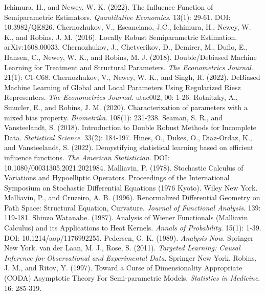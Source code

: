 \documentclass[uplatex, dvipdfmx]{jsarticle}
\begin{document}
\begin{thebibliography}{99}
    Ichimura, H., and Newey, W. K. (2022). The Influence Function of Semiparametric Estimators. \textit{Quantitative Economics}. 13(1): 29-61. DOI: 10.3982/QE826.
    Chernozhukov, V., Escanciano, J.C., Ichimura, H., Newey, W. K., and Robins, J. M. (2016). Locally Robust Semiparametric Estimation. arXiv:1608.00033.
    Chernozhukov, J., Chetverikov, D., Demirer, M., Duflo, E., Hansen, C., Newey, W. K., and Robins, M. J. (2018). Double/Debiased Machine Learning for Treatment and Structural Parameters. \textit{The Econometrics Journal}. 21(1): C1-C68.
    Chernozhukov, V., Newey, W. K., and Singh, R. (2022). DeBiased Machine Learning of Global and Local Parameters Using Regularized Riesz Representers. \textit{The Econometrics Journal}. utac002, 00: 1-26.
    Rotnitzky, A., Smucler, E., and Robins, J. M. (2020). Characterization of parameters with a mixed bias property. \textit{Biometrika}. 108(1): 231-238.
    Seaman, S. R., and Vansteelandt, S. (2018). Introduction to Double Robust Methods for Incomplete Data. \textit{Statistical Science}. 33(2): 184-197.
    Hines, O., Dukes, O., Diaz-Ordaz, K., and Vansteelandt, S. (2022). Demystifying statistical learning based on efficient influence functions. \textit{The American Statistician}. DOI: 10.1080/00031305.2021.2021984.
    Malliavin, P. (1978). Stochastic Calculus of Variations and Hypoelliptic Operators. Proceedings of the International Symposium on Stochastic Differential Equations (1976 Kyoto). Wiley New York.
    Malliavin, P., and Cruzeiro, A. B. (1996). Renormalized Differential Geometry on Path Space: Structural Equation, Curvature. \textit{Journal of Functional Analysis}. 139: 119-181.
    Shinzo Watanabe. (1987). Analysis of Wiener Functionals (Malliavin Calculus) and its Applications to Heat Kernels. \textit{Annals of Probability}. 15(1): 1-39. DOI: 10.1214/aop/1176992255.
    Pedersen, G. K. (1989). \textit{Analysis Now}. Springer New York.
    van der Laan, M. J., Rose, S. (2011). \textit{Targeted Learning: Causal Inference for Observational and Experimental Data}. Springer New York.
    Robins, J. M., and Ritov, Y. (1997). Toward a Curse of Dimensionality Appropriate (CODA) Asymptotic Theory For Semi-parametric Models. \textit{Statistics in Medicine}. 16: 285-319.
\end{thebibliography}
\end{document}

